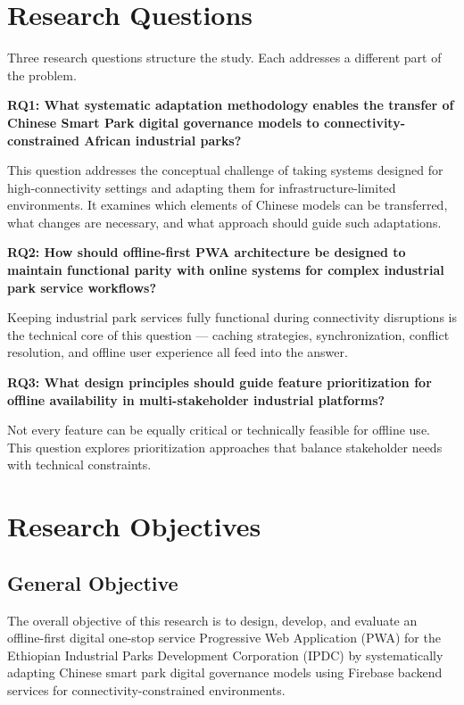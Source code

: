 \section{Research Questions}

Three research questions structure the study. Each addresses a different part of the problem.

\textbf{RQ1: What systematic adaptation methodology enables the transfer of Chinese Smart Park digital governance models to connectivity-constrained African industrial parks?}

This question addresses the conceptual challenge of taking systems designed for high-connectivity settings and adapting them for infrastructure-limited environments. It examines which elements of Chinese models can be transferred, what changes are necessary, and what approach should guide such adaptations.

\textbf{RQ2: How should offline-first PWA architecture be designed to maintain functional parity with online systems for complex industrial park service workflows?}

Keeping industrial park services fully functional during connectivity disruptions is the technical core of this question --- caching strategies, synchronization, conflict resolution, and offline user experience all feed into the answer.

\textbf{RQ3: What design principles should guide feature prioritization for offline availability in multi-stakeholder industrial platforms?}

Not every feature can be equally critical or technically feasible for offline use. This question explores prioritization approaches that balance stakeholder needs with technical constraints.

\section{Research Objectives}

\subsection{General Objective}

The overall objective of this research is to design, develop, and evaluate an offline-first digital one-stop service Progressive Web Application (PWA) for the Ethiopian Industrial Parks Development Corporation (IPDC) by systematically adapting Chinese smart park digital governance models using Firebase backend services for connectivity-constrained environments.

